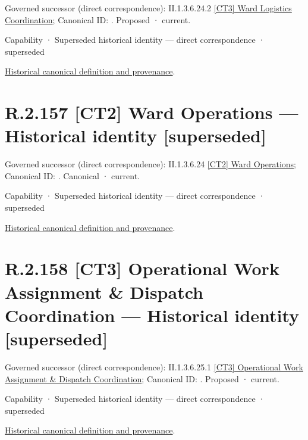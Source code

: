 {\small Governed successor (direct correspondence): II.1.3.6.24.2 \hyperref[element:3249647f7b9846c899f982ab339c81f9]{[CT3] Ward Logistics Coordination}; Canonical ID: \texttt{}. Proposed · current.}\par
\label{element:8a9dcc3b5f0143458ec71bc188a56020}
{\small Capability · Superseded historical identity — direct correspondence · superseded}\par
\href{../../../../../../../continuum/strategy/capability/8a9dcc3b5f0143458ec71bc188a56020.md}{Historical canonical definition and provenance}.\par
\section*{R.2.157 [CT2] Ward Operations — Historical identity [superseded]}
\label{navigation:R.2.157}

{\small Governed successor (direct correspondence): II.1.3.6.24 \hyperref[element:f996ecca728f4942a88b034aca818a99]{[CT2] Ward Operations}; Canonical ID: \texttt{}. Canonical · current.}\par
\label{element:bf3d2e3581f24beda20a6a3a3348460e}
{\small Capability · Superseded historical identity — direct correspondence · superseded}\par
\href{../../../../../../../continuum/strategy/capability/bf3d2e3581f24beda20a6a3a3348460e.md}{Historical canonical definition and provenance}.\par
\section*{R.2.158 [CT3] Operational Work Assignment \& Dispatch Coordination — Historical identity [superseded]}
\label{navigation:R.2.158}

{\small Governed successor (direct correspondence): II.1.3.6.25.1 \hyperref[element:3b58935cfa974176989c3c75d76a00fe]{[CT3] Operational Work Assignment \& Dispatch Coordination}; Canonical ID: \texttt{}. Proposed · current.}\par
\label{element:b42afda9e876463ba56fa8f73fe7a32a}
{\small Capability · Superseded historical identity — direct correspondence · superseded}\par
\href{../../../../../../../continuum/strategy/capability/b42afda9e876463ba56fa8f73fe7a32a.md}{Historical canonical definition and provenance}.\par

